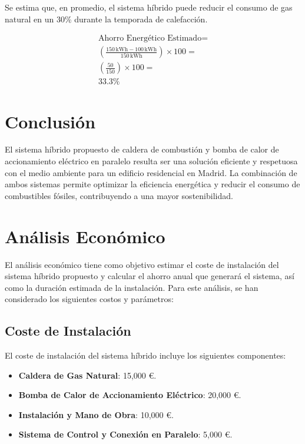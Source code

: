 \documentclass[a4paper,10pt,twocolumn]{article}
\begin{document}
\begin{Form}
	Se estima que, en promedio, el sistema híbrido puede reducir el consumo de gas natural en un 30\% durante la temporada de calefacción.

	\begin{align*}
		\text{Ahorro Energético Estimado} =                                                         \\
		\left( \frac{150 \, \text{kWh} - 100 \, \text{kWh}}{150 \, \text{kWh}} \right) \times 100 = \\
		\left( \frac{50}{150} \right) \times 100 =                                                  \\
		33.3\%
	\end{align*}

	\section{Conclusión}
	El sistema híbrido propuesto de caldera de combustión y bomba de calor de accionamiento eléctrico en paralelo resulta ser una solución eficiente y respetuosa con el medio ambiente para un edificio residencial en Madrid. La combinación de ambos sistemas permite optimizar la eficiencia energética y reducir el consumo de combustibles fósiles, contribuyendo a una mayor sostenibilidad.


	\section{Análisis Económico}

	El análisis económico tiene como objetivo estimar el coste de instalación del sistema híbrido propuesto y calcular el ahorro anual que generará el sistema, así como la duración estimada de la instalación. Para este análisis, se han considerado los siguientes costos y parámetros:

	\subsection{Coste de Instalación}
	El coste de instalación del sistema híbrido incluye los siguientes componentes:
	\begin{itemize}
		\item \textbf{Caldera de Gas Natural}: 15,000 €.
		\item \textbf{Bomba de Calor de Accionamiento Eléctrico}: 20,000 €.
		\item \textbf{Instalación y Mano de Obra}: 10,000 €.
		\item \textbf{Sistema de Control y Conexión en Paralelo}: 5,000 €.
	\end{itemize}


\end{Form}
\end{document}
